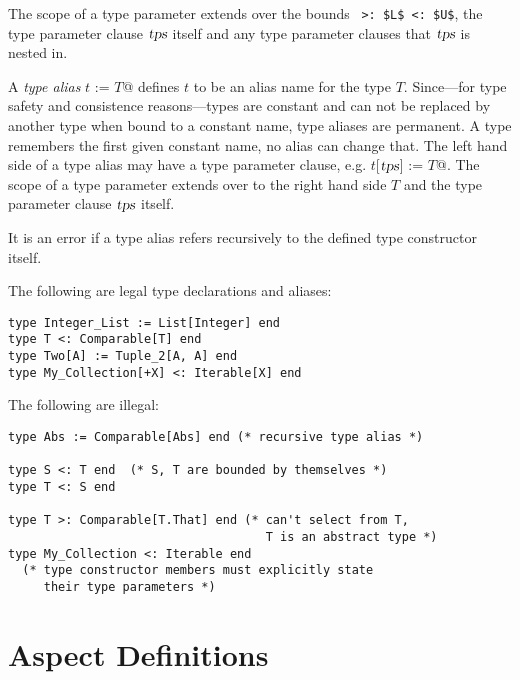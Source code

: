 The scope of a type parameter extends over the bounds ~\lstinline!>: $L$ <: $U$!, the type parameter clause $\mbox{\sl tps}$ itself and any type parameter clauses that $\mbox{\sl tps}$ is nested in.

A {\em type alias} \lstinline@type $t$ := $T$@ defines $t$ to be an alias name for the type $T$. Since---for type safety and consistence reasons---types are constant and can not be replaced by another type when bound to a constant name, type aliases are permanent. A type remembers the first given constant name, no alias can change that. The left hand side of a type alias may have a type parameter clause, e.g. \lstinline@type $t$[$\mbox{\sl tps}$] := $T$@. The scope of a type parameter extends over to the right hand side $T$ and the type parameter clause $\mbox{\sl tps}$ itself. 

It is an error if a type alias refers recursively to the defined type constructor itself. 

\example The following are legal type declarations and aliases:
\begin{lstlisting}
type Integer_List := List[Integer] end
type T <: Comparable[T] end
type Two[A] := Tuple_2[A, A] end
type My_Collection[+X] <: Iterable[X] end
\end{lstlisting}
The following are illegal:
\begin{lstlisting}
type Abs := Comparable[Abs] end (* recursive type alias *)

type S <: T end  (* S, T are bounded by themselves *)
type T <: S end

type T >: Comparable[T.That] end (* can't select from T,
                                    T is an abstract type *)
type My_Collection <: Iterable end
  (* type constructor members must explicitly state
     their type parameters *)
\end{lstlisting}





\section{Aspect Definitions}
\label{sec:aspects}

